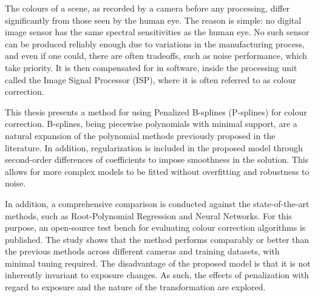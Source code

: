 The colours of a scene, as recorded by a camera before any processing, differ significantly from those seen by the human eye. The reason is simple: no digital image sensor has the same spectral sensitivities as the human eye. No such sensor can be produced reliably enough due to variations in the manufacturing process, and even if one could, there are often tradeoffs, such as noise performance, which take priority. It is then compensated for in software, inside the processing unit called the Image Signal Processor (ISP), where it is often referred to as colour correction.

This thesis presents a method for using Penalized B-splines (P-splines) for colour correction. B-splines, being piecewise polynomials with minimal support, are a natural expansion of the polynomial methods previously proposed in the literature. In addition, regularization is included in the proposed model through second-order differences of coefficients to impose smoothness in the solution. This allows for more complex models to be fitted without overfitting and robustness to noise.

In addition, a comprehensive comparison is conducted against the state-of-the-art methods, such as Root-Polynomial Regression and Neural Networks.
For this purpose, an open-source test bench for evaluating colour correction algorithms is published. The study shows that the method performs comparably or better than the previous methods across different cameras and training datasets, with minimal tuning required. The disadvantage of the proposed model is that it is not inherently invariant to exposure changes. As such, the effects of penalization with regard to exposure and the nature of the transformation are explored.
